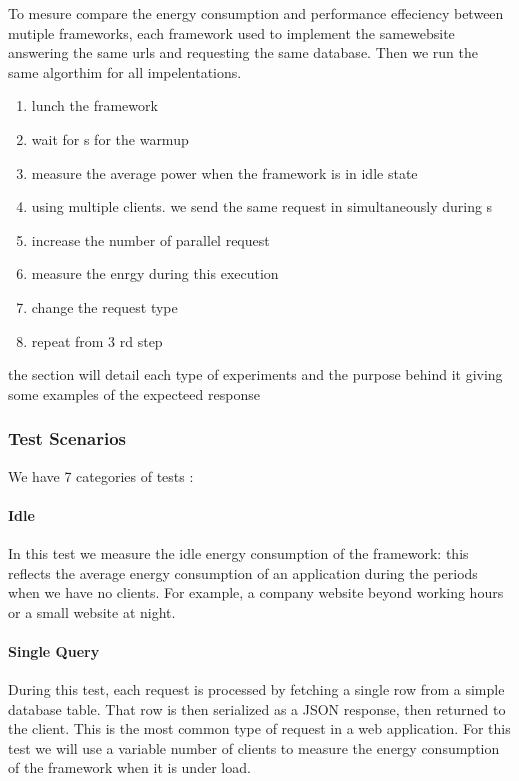To mesure compare the energy consumption and performance effeciency between mutiple frameworks, each framework used to implement the samewebsite answering the same urls and requesting the same database. Then we run the same algorthim for all impelentations.
\begin{enumerate}
    \item lunch the framework
    \item wait for \duration s for the warmup
    \item measure the average power when the framework is in idle state
    \item using multiple clients. we send the same request in simultaneously during \duration s
    \item increase the number of parallel request
    \item measure the enrgy during this execution
    \item change the request type
    \item repeat from 3 rd step
\end{enumerate}
the section will detail each type of experiments  and the purpose behind it giving some examples of the expecteed response

\subsubsection{Test Scenarios}
We have 7 categories of tests :
\paragraph{Idle}
In this test we measure the idle energy consumption of the framework: this reflects the average energy consumption of an application during the periods when we have no clients.
For example, a company website beyond working hours or a small website at night.


\paragraph{Single Query}
During this test, each request  is processed by fetching a single row from a simple database table. That row is then serialized as a JSON response, then returned to the client. This is the most common type of request in a web application. For this test we will use a variable number of clients to measure the energy consumption of the framework when it is under load.

